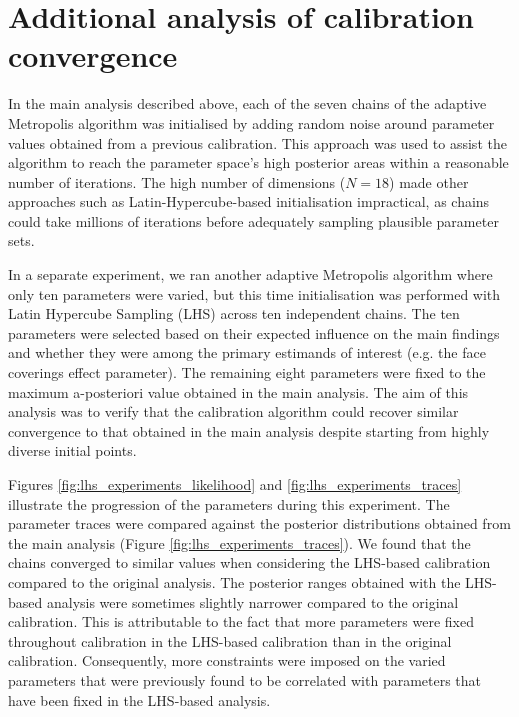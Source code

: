 
\section{Additional analysis of calibration convergence}

In the main analysis described above, each of the seven chains of the adaptive Metropolis algorithm was initialised by adding random noise around parameter values obtained from a previous calibration. This approach was used to assist the algorithm to reach the parameter space's high posterior areas within a reasonable number of iterations. The high number of dimensions ($N=18$) made other approaches such as Latin-Hypercube-based initialisation impractical, as chains could take millions of iterations before adequately sampling plausible parameter sets.

In a separate experiment, we ran another adaptive Metropolis algorithm where only ten parameters were varied, but this time initialisation was performed with Latin Hypercube Sampling (LHS) across ten independent chains. The ten parameters were selected based on their expected influence on the main findings and whether they were among the primary estimands of interest (e.g. the face coverings effect parameter). The remaining eight parameters were fixed to the maximum a-posteriori value obtained in the main analysis. The aim of this analysis was to verify that the calibration algorithm could recover similar convergence to that obtained in the main analysis despite starting from highly diverse initial points.

Figures \ref{fig:lhs_experiments_likelihood} and \ref{fig:lhs_experiments_traces} illustrate the progression of the parameters during this experiment. The parameter traces were compared against the posterior distributions obtained from the main analysis (Figure \ref{fig:lhs_experiments_traces}). We found that the chains converged to similar values when considering the LHS-based calibration compared to the original analysis. The posterior ranges obtained with the LHS-based analysis were sometimes slightly narrower compared to the original calibration. This is attributable to the fact that more parameters were fixed throughout calibration in the LHS-based calibration than in the original calibration. Consequently, more constraints were imposed on the varied parameters that were previously found to be correlated with parameters that have been fixed in the LHS-based analysis.

